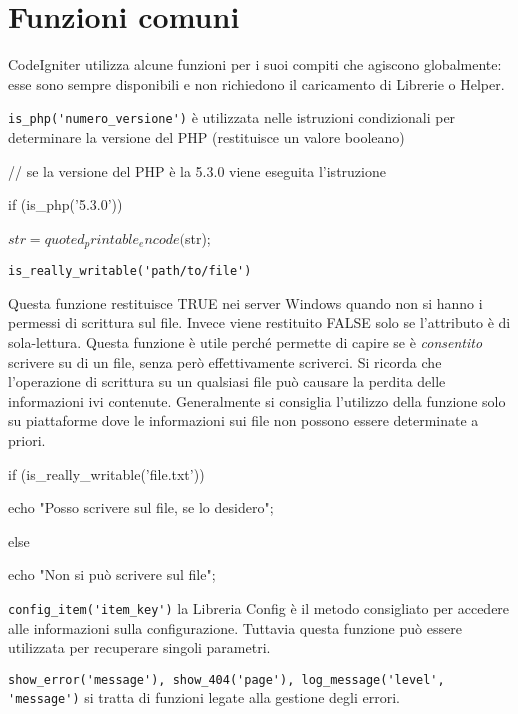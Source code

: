 \chapter{Funzioni comuni}
\label{cap:funzionicomuni}

CodeIgniter utilizza alcune funzioni per i suoi compiti che agiscono globalmente: esse sono sempre disponibili e non richiedono il caricamento di Librerie o Helper.

\verb|is_php('numero_versione')| è utilizzata nelle istruzioni condizionali per determinare la versione del \ac{PHP} (restituisce un valore booleano)

\begin{code}
// se la versione del PHP è la 5.3.0 viene eseguita l'istruzione

if (is_php('5.3.0')) {

	$str = quoted_printable_encode($str);
	
}
\end{code}

\verb|is_really_writable('path/to/file')|

Questa funzione restituisce TRUE nei server Windows quando non si hanno i permessi di scrittura sul file. Invece viene restituito FALSE solo se l'attributo è di sola-lettura. Questa funzione è utile perché permette di capire se è \emph{consentito} scrivere su di un file, senza però effettivamente scriverci. Si ricorda che l'operazione di scrittura su un qualsiasi file può causare la perdita delle informazioni ivi contenute. Generalmente si consiglia l'utilizzo della funzione solo su piattaforme dove le informazioni sui file non possono essere determinate a priori.

\begin{code}
if (is_really_writable('file.txt')) {

	echo "Posso scrivere sul file, se lo desidero";

}

else {

    echo "Non si può scrivere sul file";

}
\end{code}

\verb|config_item('item_key')| la Libreria Config è il metodo consigliato per accedere alle informazioni sulla configurazione. Tuttavia questa funzione può essere utilizzata per recuperare singoli parametri.

\verb|show_error('message'), show_404('page'), log_message('level', 'message')| si tratta di funzioni legate alla gestione degli errori.

